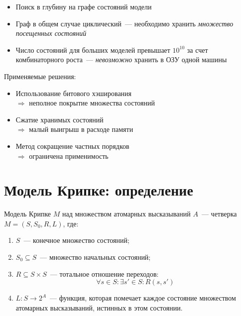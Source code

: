 \documentclass[12pt]{article}
\begin{document}
\small{
  \begin{itemize}
  \item Поиск в глубину на графе состояний модели
  \item Граф в общем случае циклический~--- необходимо хранить \textit{множество посещенных состояний}
  \item Число состояний для больших моделей превышает $10^{10}$ за счет комбинаторного
    роста~--- \textit{невозможно} хранить в ОЗУ одной машины
  \end{itemize}
  
  \begin{minipage}[t]{0.25\linewidth}
    \begin{flushright}
      Применяемые решения:
    \end{flushright}
  \end{minipage}
  \begin{minipage}[t]{0.7\linewidth}
    \begin{flushleft}
      \begin{itemize}
      \item Использование битового \mbox{хэширования} \\ $\Rightarrow$ неполное покрытие множества состояний
      \item Сжатие хранимых состояний \\ $\Rightarrow$ малый выигрыш в расходе памяти
      \item Метод сокращение частных порядков \\ $\Rightarrow$ ограничена применимость
      \end{itemize}
    \end{flushleft}
  \end{minipage}
}

\section{Модель Крипке: определение}
\label{sec:kripke-def}

Модель Крипке $M$ над множеством атомарных высказываний $A$~--- четверка $M=(S, S_0, R,
L)$, где:
\begin{enumerate}
\item $S$~--- конечное множество состояний;
\item $S_0 \subseteq S$~--- множество начальных состояний;
\item $R \subseteq S \times S$~--- тотальное отношение переходов: $$\forall s \in S\colon \exists
  s' \in S \colon R(s, s')$$
\item $L: S \rightarrow 2^{A}$~--- функция, которая помечает каждое состояние множеством
  атомарных высказываний, истинных в этом состоянии.
\end{enumerate}
\end{document}
